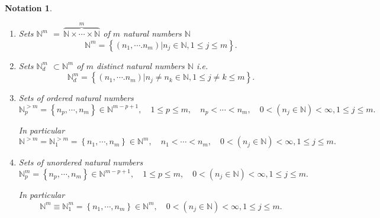 \documentclass[aps,preprint]{revtex4}%
\newtheorem{notation}[theorem]{Notation}
\begin{document}
\begin{notation}
\begin{enumerate}
\item Sets $\mathbb{N}^{m}$ $=\,\overset{m}{\overbrace{\mathbb{N\times
\cdots\times N}}}$ of $m$ natural numbers $\mathbb{N}$
\begin{equation}
\mathbb{N}^{m}=\left\{  \left.  \left(  n_{1},\cdots.n_{m}\right)  \right\vert
n_{j}\in\mathbb{N},1\leq j\leq m\right\}  .
\end{equation}


\item Sets $\mathbb{N}_{d}^{m}$ $\subset\mathbb{N}^{m}$ of $m$ distinct
natural numbers $\mathbb{N}$ i.e.
\begin{equation}
\mathbb{N}_{d}^{m}=\left\{  \left.  \left(  n_{1},\cdots.n_{m}\right)
\right\vert n_{j}\neq n_{k}\in\mathbb{N},1\leq j\neq k\leq m\right\}  .
\end{equation}


\item Sets of \emph{ordered} natural numbers
\begin{equation}
\mathbb{N}_{p}^{>m}=\left\{  n_{p},\cdots,n_{m}\right\}  \in\mathbb{N}%
^{m-p+1},\quad1\leq p\leq m,\quad n_{p}<\cdots<n_{m},\quad0<\left(  n_{j}%
\in\mathbb{N}\right)  <\infty,1\leq j\leq m.
\end{equation}


In particular
\begin{equation}
\mathbb{N}^{>m}=\mathbb{N}_{1}^{>m}=\left\{  n_{1},\cdots,n_{m}\right\}
\in\mathbb{N}^{m},\quad n_{1}<\cdots<n_{m},\quad0<\left(  n_{j}\in
\mathbb{N}\right)  <\infty,1\leq j\leq m.
\end{equation}


\item Sets of \emph{unordered} natural numbers%
\begin{equation}
\mathbb{N}_{p}^{m}=\left\{  n_{p},\cdots,n_{m}\right\}  \in\mathbb{N}%
^{m-p+1},\quad1\leq p\leq m,\quad0<\left(  n_{j}\in\mathbb{N}\right)
<\infty,1\leq j\leq m.
\end{equation}


In particular
\begin{equation}
\mathbb{N}^{m}\equiv\mathbb{N}_{1}^{m}=\left\{  n_{1},\cdots,n_{m}\right\}
\in\mathbb{N}^{m},\quad0<\left(  n_{j}\in\mathbb{N}\right)  <\infty,1\leq
j\leq m.
\end{equation}



\end{enumerate}
\end{notation}
\end{document}
